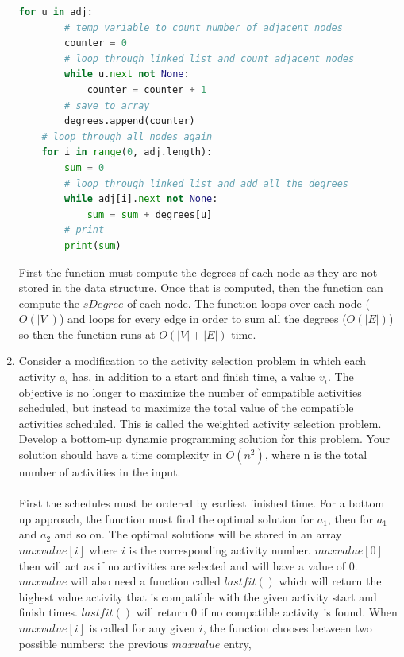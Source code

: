 \documentclass{article}
\begin{document}
\begin{enumerate}
\begin{lstlisting}[language=python]
    for u in adj:
        # temp variable to count number of adjacent nodes
        counter = 0
        # loop through linked list and count adjacent nodes
        while u.next not None:
            counter = counter + 1
        # save to array
        degrees.append(counter)
    # loop through all nodes again
    for i in range(0, adj.length):
        sum = 0
        # loop through linked list and add all the degrees
        while adj[i].next not None:
            sum = sum + degrees[u]
        # print
        print(sum)
            \end{lstlisting}
            First the function must compute the degrees of each node as they 
            are not stored in the data structure. Once that is computed, then
            the function can compute the $sDegree$ of each node. The function 
            loops over each node ($O(|V|)$) and loops for every edge in order 
            to sum all the degrees ($O(|E|)$) so then the function runs at 
            $O(|V|+|E|)$ time.
        \item Consider a modification to the activity selection problem in 
        which each activity $a_i$ has, in addition to a start and finish time, 
        a value $v_i$. The objective is no longer to maximize the number of 
        compatible activities scheduled, but instead to maximize the total 
        value of the compatible activities scheduled. This is called the 
        weighted activity selection problem. Develop a bottom-up dynamic 
        programming solution for this problem. Your solution should have a 
        time complexity in $O(n^2)$, where n is the total number of activities 
        in the input.\\\\
        First the schedules must be ordered by earliest finished time. For a 
        bottom up approach, the function must find the optimal solution for 
        $a_1$, then for $a_1$ and $a_2$ and so on. The optimal solutions will
        be stored in an array $maxvalue[i]$ where $i$ is the corresponding 
        activity number. $maxvalue[0]$ then will act as if no activities are 
        selected and will have a value of 0. $maxvalue$ will also need a 
        function called $lastfit()$ which will return the highest value 
        activity that is compatible with the given activity start and finish
        times. $lastfit()$ will return 0 if no compatible activity is found. 
        When $maxvalue[i]$ is called for any given $i$, the function 
        chooses between two possible numbers: the previous $maxvalue$ entry, 

\end{enumerate}
\end{document}
